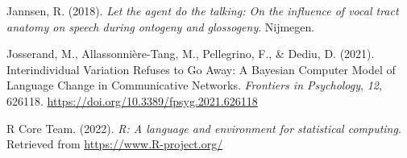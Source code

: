 \documentclass[
]{article}
\newlength{\cslhangindent}
\newlength{\cslentryspacingunit} %
\newenvironment{CSLReferences}[2] %
 {%
  \setlength{\parindent}{0pt}
  \ifodd #1
  \let\oldpar\par
  \def\par{\hangindent=\cslhangindent\oldpar}
  \fi
  \setlength{\parskip}{#2\cslentryspacingunit}
 }%
 {}
\begin{document}
\hypertarget{refs}{}
\begin{CSLReferences}{1}{0}
\leavevmode{}%
Jannsen, R. (2018). \emph{Let the agent do the talking: On the influence
of vocal tract anatomy on speech during ontogeny and glossogeny}.
Nijmegen.

\leavevmode{}%
Josserand, M., Allassonnière-Tang, M., Pellegrino, F., \& Dediu, D.
(2021). Interindividual {Variation} {Refuses} to {Go} {Away}: {A}
{Bayesian} {Computer} {Model} of {Language} {Change} in {Communicative}
{Networks}. \emph{Frontiers in Psychology}, \emph{12}, 626118.
\url{https://doi.org/10.3389/fpsyg.2021.626118}

\leavevmode{}%
R Core Team. (2022). \emph{R: A language and environment for statistical
computing}. Retrieved from \url{https://www.R-project.org/}

\end{CSLReferences}
\end{document}
